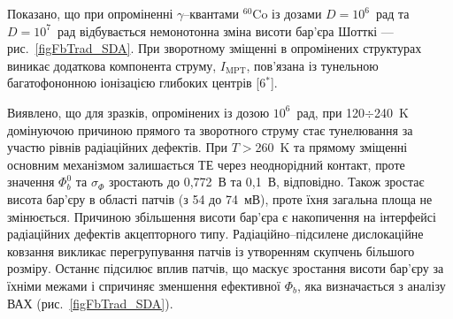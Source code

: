 Показано, що при
опроміненні $\gamma$--квантами $^{60}$Co із дозами $D\!=\!10^6$~рад та $D\!=\!10^7$~рад відбувається
немонотонна зміна висоти бар'єра Шотткі --- рис.~\ref{figFbTrad_SDA}.
При зворотному зміщенні в опромінених структурах виникає додаткова компонента струму, $I_\mathrm{MPT}$,
пов'язана із тунельною багатофононною іонізацією глибоких центрів
[6$^*$].

Виявлено, що для зразків, опромінених із дозою  $10^6$~рад, при 120$\div$240~K
домінуючою причиною прямого та зворотного струму
стає тунелювання за участю рівнів радіаційних дефектів.
При $T\!>$260~K та прямому зміщенні
основним механізмом залишається ТЕ через неоднорідний контакт, проте значення $\Phi_b^0$ та $\sigma_{\Phi}$
зростають до 0,772~В та 0,1~В, відповідно.
Також зростає висота бар'єру в області патчів (з 54 до 74~мВ), проте їхня загальна площа не змінюється.
Причиною збільшення висоти бар'єра є накопичення на інтерфейсі радіаційних дефектів акцепторного типу.
Радіаційно--підсилене дислокаційне ковзання викликає  перегрупування патчів із утворенням скупчень більшого розміру.
Останнє підсилює вплив патчів, що  маскує зростання висоти бар'єру за їхніми межами
і спричиняє зменшення ефективної $\Phi_b$, яка визначається з аналізу ВАХ (рис.~\ref{figFbTrad_SDA}).

